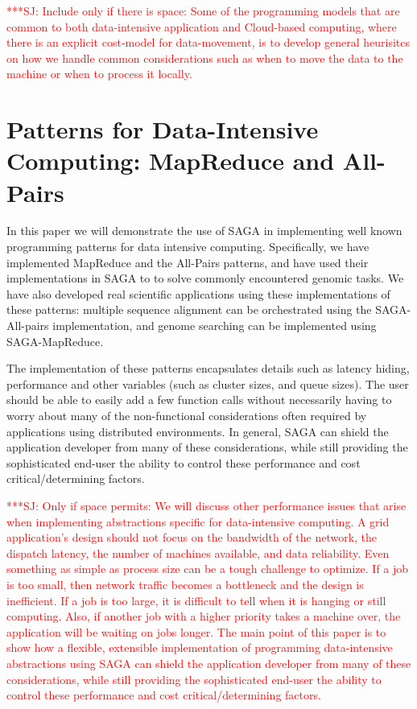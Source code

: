 \documentclass[conference,final]{IEEEtran}
\newcommand{\jhanote}[1]{ {\textcolor{red} { ***SJ: #1 }}}
\newcommand{\jhanote}[1]{}
\begin{document}
\jhanote{Include only if there is space: Some of the programming
  models that are common to both data-intensive application and
  Cloud-based computing, where there is an explicit cost-model for
  data-movement, is to develop general heurisitcs on how we handle
  common considerations such as when to move the data to the machine
  or when to process it locally.}

\section{Patterns for Data-Intensive Computing: MapReduce and
  All-Pairs}

In this paper we will demonstrate the use of SAGA in implementing well
known programming patterns for data intensive computing.
Specifically, we have implemented MapReduce and the All-Pairs
patterns, and have used their implementations in SAGA to to solve
commonly encountered genomic tasks.  We have also developed real
scientific applications using these implementations of these patterns:
multiple sequence alignment can be orchestrated using the
SAGA-All-pairs implementation, and genome searching can be implemented
using SAGA-MapReduce.

The implementation of these patterns encapsulates details such as
latency hiding, performance and other variables (such as cluster
sizes, and queue sizes).  The user should be able to easily add a few
function calls without necessarily having to worry about many of the
non-functional considerations often required by applications using
distributed environments.  In general, SAGA can shield the application
developer from many of these considerations, while still providing the
sophisticated end-user the ability to control these performance and
cost critical/determining factors.

\jhanote{Only if space permits: We will discuss other performance
  issues that arise when implementing abstractions specific for
  data-intensive computing.  A grid application's design should not
  focus on the bandwidth of the network, the dispatch latency, the
  number of machines available, and data reliability.  Even something
  as simple as process size can be a tough challenge to optimize.  If
  a job is too small, then network traffic becomes a bottleneck and
  the design is inefficient.  If a job is too large, it is difficult
  to tell when it is hanging or still computing.  Also, if another job
  with a higher priority takes a machine over, the application will be
  waiting on jobs longer.  The main point of this paper is to show how
  a flexible, extensible implementation of programming data-intensive
  abstractions using SAGA can shield the application developer from
  many of these considerations, while still providing the
  sophisticated end-user the ability to control these performance and
  cost critical/determining factors.}
\end{document}
